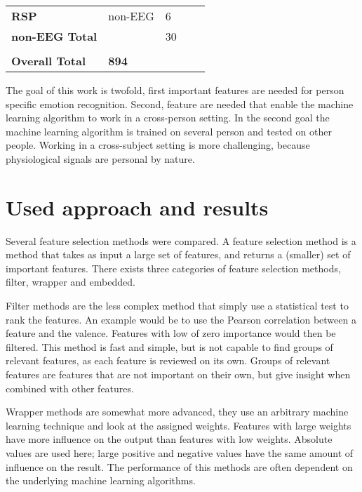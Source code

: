 \documentclass[12pt,journal,compsoc]{IEEEtran}
\newcommand{\npar}{\par \vspace{2.3ex plus 0.3ex minus 0.3ex}}
\begin{document}
\begin{table}[H]
\begin{tabular}{l|llll}
\textbf{RSP}            & non-EEG       & 6                             &                           &              \\
\textbf{non-EEG Total}  &               & 30                            &                           &              \\
                        &               &                               &                           &              \\ \hline
\textbf{Overall Total}  & \textbf{894}  &                               &                           &             
\end{tabular}
\end{table}

The goal of this work is twofold, first important features are needed for person specific emotion recognition. Second, feature are needed that enable the machine learning algorithm to work in a cross-person setting. In the second goal the machine learning algorithm is trained on several person and tested on other people. Working in a cross-subject setting is more challenging, because physiological signals are personal by nature. %

\section{Used approach and results} \label{approach}

Several feature selection methods were compared. A feature selection method is a method that takes as input a large set of features, and returns a (smaller) set of important features. There exists three categories of feature selection methods, filter, wrapper and embedded.

\npar

Filter methods are the less complex method that simply use a statistical test to rank the features. An example would be to use the Pearson correlation between a feature and the valence. Features with low of zero importance would then be filtered. This method is fast and simple, but is not capable to find groups of relevant features, as each feature is reviewed on its own. Groups of relevant features are features that are not important on their own, but give insight when combined with other features.

\npar

Wrapper methods are somewhat more advanced, they use an arbitrary machine learning technique and look at the assigned weights. Features with large weights have more influence on the output than features with low weights. Absolute values are used here; large positive and negative values have the same amount of influence on the result. The performance of this methods are often dependent on the underlying machine learning algorithms.
\end{document}
